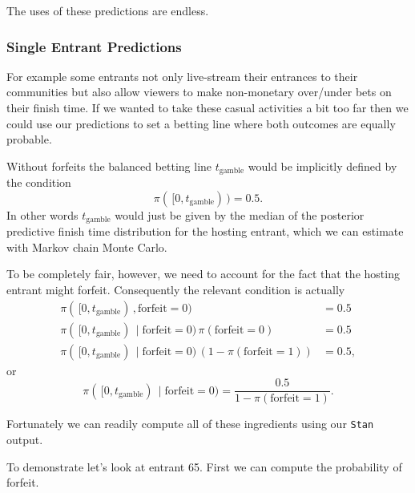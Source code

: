 \documentclass[
  letterpaper,
  DIV=11,
  numbers=noendperiod]{scrartcl}
\newenvironment{Shaded}{\begin{snugshade}}{\end{snugshade}}
\newcommand{\DecValTok}[1]{\textcolor[rgb]{0.68,0.00,0.00}{#1}}
\newcommand{\FunctionTok}[1]{\textcolor[rgb]{0.28,0.35,0.67}{#1}}
\newcommand{\NormalTok}[1]{\textcolor[rgb]{0.00,0.23,0.31}{#1}}
\newcommand{\OtherTok}[1]{\textcolor[rgb]{0.00,0.23,0.31}{#1}}
\newcommand{\SpecialCharTok}[1]{\textcolor[rgb]{0.37,0.37,0.37}{#1}}
\newcommand{\StringTok}[1]{\textcolor[rgb]{0.13,0.47,0.30}{#1}}
\begin{document}
The uses of these predictions are endless.

\subsubsection{Single Entrant
Predictions}\label{single-entrant-predictions}

For example some entrants not only live-stream their entrances to their
communities but also allow viewers to make non-monetary over/under bets
on their finish time. If we wanted to take these casual activities a bit
too far then we could use our predictions to set a betting line where
both outcomes are equally probable.

Without forfeits the balanced betting line \(t_{\mathrm{gamble}}\) would
be implicitly defined by the condition \[
\pi( \, [ 0, t_{\mathrm{gamble}} ) \, ) = 0.5.
\] In other words \(t_{\mathrm{gamble}}\) would just be given by the
median of the posterior predictive finish time distribution for the
hosting entrant, which we can estimate with Markov chain Monte Carlo.

To be completely fair, however, we need to account for the fact that the
hosting entrant might forfeit. Consequently the relevant condition is
actually \begin{align*}
\pi( \, [ 0, t_{\mathrm{gamble}} ) \, , \mathrm{forfeit} = 0 )
&=
0.5
\\
\pi( \, [ 0, t_{\mathrm{gamble}} ) \, \mid \mathrm{forfeit} = 0 ) \,
\pi( \mathrm{forfeit} = 0 )
&=
0.5
\\
\pi( \, [ 0, t_{\mathrm{gamble}} ) \, \mid \mathrm{forfeit} = 0 ) \,
\left( 1 - \pi( \mathrm{forfeit} = 1 ) \right)
&=
0.5,
\end{align*} or \[
\pi( \, [ 0, t_{\mathrm{gamble}} ) \, \mid \mathrm{forfeit} = 0 )
=
\frac{0.5}{ 1 - \pi( \mathrm{forfeit} = 1 ) }.
\]

Fortunately we can readily compute all of these ingredients using our
\texttt{Stan} output.

To demonstrate let's look at entrant 65. First we can compute the
probability of forfeit.

\begin{Shaded}
\end{Shaded}
\end{document}
